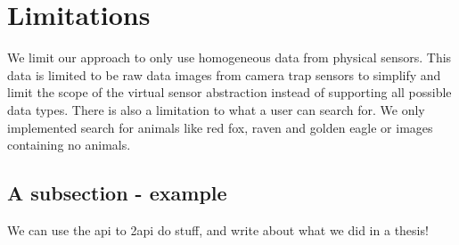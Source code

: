 \documentclass[USenglish]{uit-thesis}
\begin{document}
\section{Limitations}

We limit our approach to only use homogeneous data from physical sensors.  This data is limited to be raw data images from camera trap sensors to simplify and limit the scope of the virtual sensor abstraction instead of supporting all possible data types.
There is also a limitation to what a user can search for. We only implemented search for animals like red fox, raven and golden eagle or images containing no animals.












\iffalse
\subsection{A subsection - example}
We can use the \ac{api} to \ac{2api} do stuff, and write about what we did in a \gls{thesis}!
\end{document}
